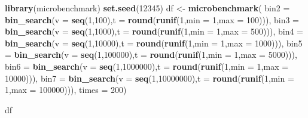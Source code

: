 \documentclass[]{article}
\newenvironment{Shaded}{\begin{snugshade}}{\end{snugshade}}
\newcommand{\KeywordTok}[1]{\textcolor[rgb]{0.13,0.29,0.53}{\textbf{#1}}}
\newcommand{\DataTypeTok}[1]{\textcolor[rgb]{0.13,0.29,0.53}{#1}}
\newcommand{\DecValTok}[1]{\textcolor[rgb]{0.00,0.00,0.81}{#1}}
\newcommand{\StringTok}[1]{\textcolor[rgb]{0.31,0.60,0.02}{#1}}
\newcommand{\NormalTok}[1]{#1}
\begin{document}
\begin{Shaded}
\begin{Highlighting}[]
\KeywordTok{library}\NormalTok{(microbenchmark)}
\KeywordTok{set.seed}\NormalTok{(}\DecValTok{12345}\NormalTok{)}
\NormalTok{df <-}\StringTok{ }\KeywordTok{microbenchmark}\NormalTok{(}
\DataTypeTok{bin2   =}  \KeywordTok{bin_search}\NormalTok{(}\DataTypeTok{v =} \KeywordTok{seq}\NormalTok{(}\DecValTok{1}\NormalTok{,}\DecValTok{100}\NormalTok{),}\DataTypeTok{t =} \KeywordTok{round}\NormalTok{(}\KeywordTok{runif}\NormalTok{(}\DecValTok{1}\NormalTok{,}\DataTypeTok{min =} \DecValTok{1}\NormalTok{,}\DataTypeTok{max =} \DecValTok{100}\NormalTok{))),}
\DataTypeTok{bin3 =}  \KeywordTok{bin_search}\NormalTok{(}\DataTypeTok{v =} \KeywordTok{seq}\NormalTok{(}\DecValTok{1}\NormalTok{,}\DecValTok{1000}\NormalTok{),}\DataTypeTok{t =} \KeywordTok{round}\NormalTok{(}\KeywordTok{runif}\NormalTok{(}\DecValTok{1}\NormalTok{,}\DataTypeTok{min =} \DecValTok{1}\NormalTok{,}\DataTypeTok{max =} \DecValTok{500}\NormalTok{))),}
\DataTypeTok{bin4   =}  \KeywordTok{bin_search}\NormalTok{(}\DataTypeTok{v =} \KeywordTok{seq}\NormalTok{(}\DecValTok{1}\NormalTok{,}\DecValTok{10000}\NormalTok{),}\DataTypeTok{t =} \KeywordTok{round}\NormalTok{(}\KeywordTok{runif}\NormalTok{(}\DecValTok{1}\NormalTok{,}\DataTypeTok{min =} \DecValTok{1}\NormalTok{,}\DataTypeTok{max =} \DecValTok{1000}\NormalTok{))),}
\DataTypeTok{bin5 =}  \KeywordTok{bin_search}\NormalTok{(}\DataTypeTok{v =} \KeywordTok{seq}\NormalTok{(}\DecValTok{1}\NormalTok{,}\DecValTok{100000}\NormalTok{),}\DataTypeTok{t =} \KeywordTok{round}\NormalTok{(}\KeywordTok{runif}\NormalTok{(}\DecValTok{1}\NormalTok{,}\DataTypeTok{min =} \DecValTok{1}\NormalTok{,}\DataTypeTok{max =} \DecValTok{5000}\NormalTok{))),}
\DataTypeTok{bin6   =}  \KeywordTok{bin_search}\NormalTok{(}\DataTypeTok{v =} \KeywordTok{seq}\NormalTok{(}\DecValTok{1}\NormalTok{,}\DecValTok{1000000}\NormalTok{),}\DataTypeTok{t =} \KeywordTok{round}\NormalTok{(}\KeywordTok{runif}\NormalTok{(}\DecValTok{1}\NormalTok{,}\DataTypeTok{min =} \DecValTok{1}\NormalTok{,}\DataTypeTok{max =} \DecValTok{10000}\NormalTok{))),}
\DataTypeTok{bin7   =}  \KeywordTok{bin_search}\NormalTok{(}\DataTypeTok{v =} \KeywordTok{seq}\NormalTok{(}\DecValTok{1}\NormalTok{,}\DecValTok{10000000}\NormalTok{),}\DataTypeTok{t =} \KeywordTok{round}\NormalTok{(}\KeywordTok{runif}\NormalTok{(}\DecValTok{1}\NormalTok{,}\DataTypeTok{min =} \DecValTok{1}\NormalTok{,}\DataTypeTok{max =} \DecValTok{100000}\NormalTok{))),}
\DataTypeTok{times =} \DecValTok{200}\NormalTok{)}

\NormalTok{df}
\end{Highlighting}
\end{Shaded}
\end{document}
